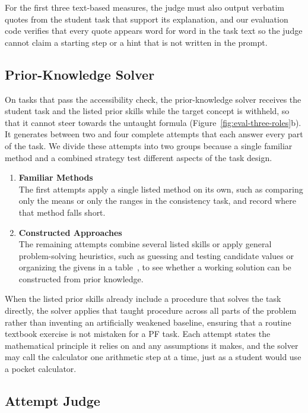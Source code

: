 For the first three text-based measures, the judge must also output verbatim quotes from the student task that support its explanation, and our evaluation code verifies that every quote appears word for word in the task text so the judge cannot claim a starting step or a hint that is not written in the prompt.

\subsection{Prior-Knowledge Solver}
\label{subsec:eval-solver}

On tasks that pass the accessibility check, the prior-knowledge solver receives the student task and the listed prior skills while the target concept is withheld, so that it cannot steer towards the untaught formula (Figure~\ref{fig:eval-three-roles}b). It generates between two and four complete attempts that each answer every part of the task. We divide these attempts into two groups because a single familiar method and a combined strategy test different aspects of the task design.
\begin{enumerate}[leftmargin=0.6cm,itemsep=0.4em,topsep=0.4em]
    \item \textbf{Familiar Methods}\\[0.2em]
    The first attempts apply a single listed method on its own, such as comparing only the means or only the ranges in the consistency task, and record where that method falls short.
    \item \textbf{Constructed Approaches}\\[0.2em]
    The remaining attempts combine several listed skills or apply general problem-solving heuristics, such as guessing and testing candidate values or organizing the givens in a table~\cite{polya1945}, to see whether a working solution can be constructed from prior knowledge.
\end{enumerate}

When the listed prior skills already include a procedure that solves the task directly, the solver applies that taught procedure across all parts of the problem rather than inventing an artificially weakened baseline, ensuring that a routine textbook exercise is not mistaken for a PF task. Each attempt states the mathematical principle it relies on and any assumptions it makes, and the solver may call the calculator one arithmetic step at a time, just as a student would use a pocket calculator.

\subsection{Attempt Judge}
\label{subsec:eval-attempt-judge}


